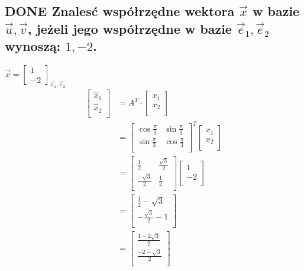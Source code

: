 \documentclass[11pt]{article}
\begin{document}
\subsection{{\bfseries\sffamily DONE} Znalesć współrzędne wektora \(\vec{x}\) w bazie \(\vec u, \vec v\), jeżeli jego współrzędne w bazie \(\vec e_1, \vec e_2\) wynoszą: \(1, -2\).}
\label{sec:org1114a59}
\(\vec x = \begin{bmatrix}
            1 \\
            -2
          \end{bmatrix}_{\vec e_1, \vec e_2}\)
\begin{align*}
  \begin{bmatrix}
    \hat x_{1} \\
    \hat x_{2} \\
  \end{bmatrix}
  &= A^{T} \cdot
    \begin{bmatrix}
      x_{1}\\
      x_{2}\\
    \end{bmatrix}
  \\
  &= \begin{bmatrix}
       \cos \frac{\pi}{3} & \sin \frac{\pi}{3}\\
       \sin \frac{\pi}{3} & \cos \frac{\pi}{3}\\
     \end{bmatrix}^{T}
    \begin{bmatrix}
      x_{1}\\
      x_{2}\\
    \end{bmatrix}
  \\
  &= \begin{bmatrix}
       \frac{1}{2} &  \frac{\sqrt{3}}{2}\\
       \frac{-\sqrt{3}}{2} & \frac{1}{2}\\
     \end{bmatrix}
    \begin{bmatrix}
      1\\
      -2\\
    \end{bmatrix}
  \\
  &= \begin{bmatrix}
       \frac{1}{2} - \sqrt{3}\\
       -\frac{\sqrt{3}}{2} - 1\\
     \end{bmatrix}
  \\
  &= \begin{bmatrix}
       \frac{1 - 2\sqrt{3}}{2}\\
       \frac{- 2 - \sqrt{3}}{2}\\
    \end{bmatrix}
\end{align*}
\end{document}
